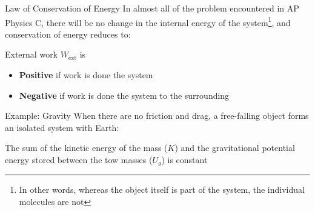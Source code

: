 \documentclass[12pt,compress,aspectratio=169]{beamer}
\begin{document}
\begin{frame}{Law of Conservation of Energy}
  In almost all of the problem encountered in AP Physics C, there will be no
  change in the internal energy of the system\footnote{In other words, whereas
  the object itself is part of the system, the individual molecules are not},
  and conservation of energy reduces to:
  

  External work $W_\text{ext}$ is
  \begin{itemize}
  \item\textbf{Positive} if work is done  the system
  \item\textbf{Negative} if work is done  the system to the
    surrounding
  \end{itemize}
\end{frame}





\begin{frame}{Example: Gravity}
  When there are no friction and drag, a free-falling object forms an isolated
  system with Earth:
  \begin{center}
  \end{center}
  The sum of the kinetic energy of the mass ($K$) and the gravitational
  potential energy stored between the tow masses ($U_g$) is constant
    
\end{frame}
\end{document}
